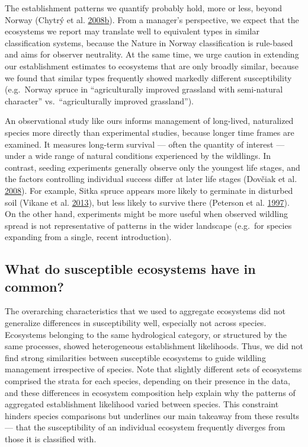 \documentclass[
]{article}
\begin{document}
The establishment patterns we quantify probably hold, more or less, beyond Norway (Chytrý et al. \protect\hyperlink{ref-chytryHabitatInvasionsAlien2008}{2008}\protect\hyperlink{ref-chytryHabitatInvasionsAlien2008}{b}).
From a manager's perspective, we expect that the ecosystems we report may translate well to equivalent types in similar classification systems, because the Nature in Norway classification is rule-based and aims for observer neutrality.
At the same time, we urge caution in extending our establishment estimates to ecosystems that are only broadly similar, because we found that similar types frequently showed markedly different susceptibility (e.g.~Norway spruce in ``agriculturally improved grassland with semi-natural character'' vs.~``agriculturally improved grassland'').

An observational study like ours informs management of long-lived, naturalized species more directly than experimental studies, because longer time frames are examined.
It measures long-term survival --- often the quantity of interest --- under a wide range of natural conditions experienced by the wildlings.
In contrast, seeding experiments generally observe only the youngest life stages, and the factors controlling individual success differ at later life stages (Dovčiak et al. \protect\hyperlink{ref-dovciakSeedRainEnvironmental2008}{2008}).
For example, Sitka spruce appears more likely to germinate in disturbed soil (Vikane et al. \protect\hyperlink{ref-vikaneInvasionCallunaHeath2013}{2013}), but less likely to survive there (Peterson et al. \protect\hyperlink{ref-petersonEcologyManagementSitka1997}{1997}).
On the other hand, experiments might be more useful when observed wildling spread is not representative of patterns in the wider landscape (e.g.~for species expanding from a single, recent introduction).

\hypertarget{what-do-susceptible-ecosystems-have-in-common}{%
\subsection{What do susceptible ecosystems have in common?}\label{what-do-susceptible-ecosystems-have-in-common}}

The overarching characteristics that we used to aggregate ecosystems did not generalize differences in susceptibility well, especially not across species.
Ecosystems belonging to the same hydrological category, or structured by the same processes, showed heterogeneous establishment likelihoods.
Thus, we did not find strong similarities between susceptible ecosystems to guide wildling management irrespective of species.
Note that slightly different sets of ecosystems comprised the strata for each species, depending on their presence in the data, and these differences in ecosystem composition help explain why the patterns of aggregated establishment likelihood varied between species.
This constraint hinders species comparisons but underlines our main takeaway from these results --- that the susceptibility of an individual ecosystem frequently diverges from those it is classified with.
\end{document}
